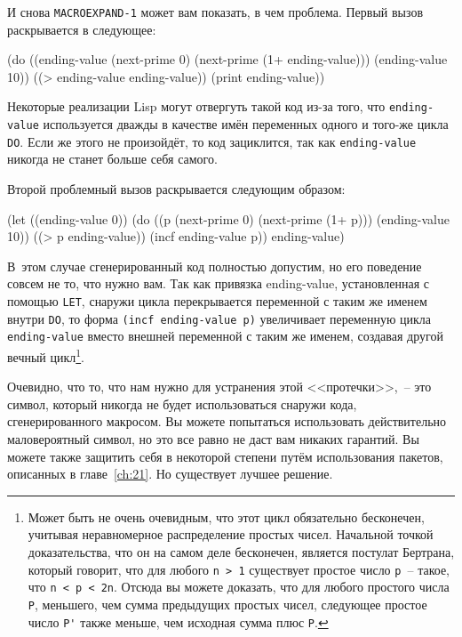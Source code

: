И снова \lstinline{MACROEXPAND-1} может вам показать, в чем проблема. Первый вызов
раскрывается в следующее:

\begin{myverb}
(do ((ending-value (next-prime 0) (next-prime (1+ ending-value)))
     (ending-value 10))
    ((> ending-value ending-value))
  (print ending-value))
\end{myverb}

Некоторые реализации Lisp могут отвергуть такой код из-за того, что \lstinline{ending-value}
используется дважды в качестве имён переменных одного и того-же цикла \lstinline{DO}. Если же
этого не произойдёт, то код зациклится, так как \lstinline{ending-value} никогда не станет
больше себя самого.

Второй проблемный вызов раскрывается следующим образом:

\begin{myverb}
(let ((ending-value 0))
  (do ((p (next-prime 0) (next-prime (1+ p)))
       (ending-value 10))
      ((> p ending-value))
    (incf ending-value p))
  ending-value)
\end{myverb}

В~этом случае сгенерированный код полностью допустим, но его поведение совсем не то, что
нужно вам. Так как привязка ending-value, установленная с помощью \lstinline{LET}, снаружи
цикла перекрывается переменной с таким же именем внутри \lstinline{DO}, то форма 
\lstinline{(incf ending-value p)} увеличивает переменную цикла \lstinline{ending-value} вместо внешней
переменной с таким же именем, создавая другой вечный цикл\footnote{Может быть не очень
  очевидным, что этот цикл обязательно бесконечен, учитывая неравномерное распределение
  простых чисел. Начальной точкой доказательства, что он на самом деле бесконечен,
  является постулат Бертрана, который говорит, что для любого \lstinline{n > 1} существует
  простое число \lstinline{p}~-- такое, что \lstinline!n < p < 2n!. Отсюда вы можете доказать, что
  для любого простого числа \lstinline{P}, меньшего, чем сумма предыдущих простых чисел,
  следующее простое число \lstinline{P'} также меньше, чем исходная сумма плюс \lstinline{P}.}.

Очевидно, что то, что нам нужно для устранения этой <<протечки>>,~-- это символ, который
никогда не будет использоваться снаружи кода, сгенерированного макросом. Вы можете
попытаться использовать действительно маловероятный символ, но это все равно не даст вам
никаких гарантий. Вы можете также защитить себя в некоторой степени путём использования
пакетов, описанных в главе~\ref{ch:21}. Но существует лучшее решение.

